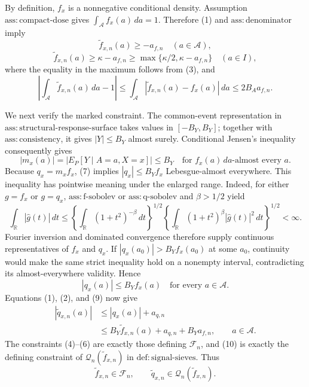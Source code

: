 By definition, \(f_x\) is a nonnegative conditional density.  Assumption \(\mathrm{ass{:}compact\text{-}dose}\) gives \(\int_{\mathcal A}f_x(a)\,da=1\).  Therefore (1) and \(\mathrm{ass{:}denominator}\) imply
\[
 \widetilde f_{x,n}(a)\ge-a_{f,n}\quad(a\in\mathcal A),          \tag{4}
\]
\[
 \widetilde f_{x,n}(a)
 \ge\kappa-a_{f,n}
 \ge\max\{\kappa/2,\kappa-a_{f,n}\}
 \quad(a\in I),                                                  \tag{5}
\]
where the equality in the maximum follows from (3), and
\[
 \left|\int_{\mathcal A}\widetilde f_{x,n}(a)\,da-1\right|
 \le\int_{\mathcal A}|\widetilde f_{x,n}(a)-f_x(a)|\,da
 \le2B_Aa_{f,n}.                                                  \tag{6}
\]

We next verify the marked constraint.  The common-event representation in \(\mathrm{ass{:}structural\text{-}response\text{-}surface}\) takes values in \([-B_Y,B_Y]\); together with \(\mathrm{ass{:}consistency}\), it gives \(|Y|\le B_Y\) almost surely.  Conditional Jensen's inequality consequently gives
\[
 |m_x(a)|=|E_P[Y\mid A=a,X=x]|\le B_Y
 \quad\text{for }f_x(a)\,da\text{-almost every }a.               \tag{7}
\]
Because \(q_x=m_xf_x\), (7) implies \(|q_x|\le B_Yf_x\) Lebesgue-almost everywhere.  This inequality has pointwise meaning under the enlarged range.  Indeed, for either \(g=f_x\) or \(g=q_x\), \(\mathrm{ass{:}f\text{-}sobolev}\) or \(\mathrm{ass{:}q\text{-}sobolev}\) and \(\beta>1/2\) yield
\[
 \int_{\mathbb R}|\widehat g(t)|\,dt
 \le
 \left\{\int_{\mathbb R}(1+t^2)^{-\beta}\,dt\right\}^{1/2}
 \left\{\int_{\mathbb R}(1+t^2)^\beta|\widehat g(t)|^2\,dt\right\}^{1/2}
 <\infty.                                                         \tag{8}
\]
Fourier inversion and dominated convergence therefore supply continuous representatives of \(f_x\) and \(q_x\).  If \(|q_x(a_0)|>B_Yf_x(a_0)\) at some \(a_0\), continuity would make the same strict inequality hold on a nonempty interval, contradicting its almost-everywhere validity.  Hence
\[
 |q_x(a)|\le B_Yf_x(a)\quad\text{for every }a\in\mathcal A.       \tag{9}
\]
Equations (1), (2), and (9) now give
\[
 \begin{aligned}
 |\widetilde q_{x,n}(a)|
 &\le |q_x(a)|+a_{q,n}\\
 &\le B_Y\widetilde f_{x,n}(a)+a_{q,n}+B_Ya_{f,n},
 \qquad a\in\mathcal A.                                         \tag{10}
 \end{aligned}
\]
The constraints (4)--(6) are exactly those defining \(\mathscr F_n\), and (10) is exactly the defining constraint of \(\mathscr Q_n(\widetilde f_{x,n})\) in \(\mathrm{def{:}signal\text{-}sieves}\).  Thus
\[
 \widetilde f_{x,n}\in\mathscr F_n,
 \qquad
 \widetilde q_{x,n}\in\mathscr Q_n(\widetilde f_{x,n}).          \tag{11}
\]

